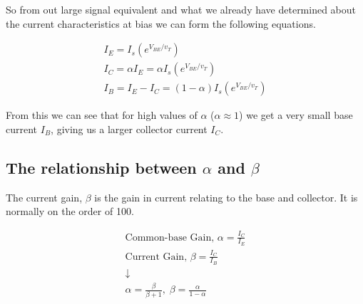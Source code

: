 So from out large signal equivalent and what we already have determined about the current characteristics at bias we can form the following equations.

\begin{gather*}
I_E = I_s\left(e^{V_{BE}/v_T}\right) \\
I_C = \alpha I_E = \alpha I_s\left(e^{V_{BE}/v_T}\right) \\
I_B = I_E - I_C = (1-\alpha)I_s\left(e^{V_{BE}/v_T}\right)
\end{gather*}

From this we can see that for high values of $\alpha$ ($\alpha \approx 1$) we get a very small base current $I_B$, giving us a larger collector current $I_C$.

\subsection{The relationship between $\alpha$ and $\beta$}

The current gain, $\beta$ is the gain in current relating to the base and collector. It is normally on the order of 100.

\begin{gather*}
\textrm{Common-base Gain, }\alpha = \frac{I_C}{I_E} \\
\textrm{Current Gain, }\beta = \frac{I_C}{I_B} \\
\downarrow \\
\alpha = \frac{\beta}{\beta + 1},\; \beta = \frac{\alpha}{1 - \alpha}
\end{gather*}